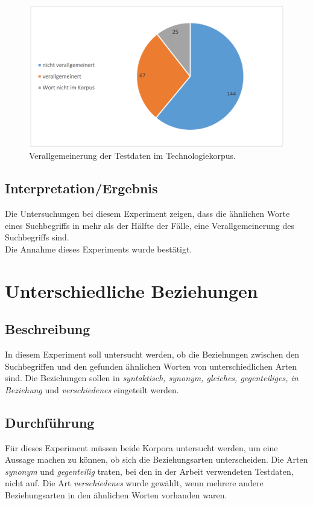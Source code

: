 \documentclass[12pt,a4paper]{report}
\begin{document}
\begin{figure}[p]
  \begin{center}
	\includegraphics[scale=0.4]{VerallgemeinerungTech.PNG}
  \end{center}  
  \caption{Verallgemeinerung der Testdaten im Technologiekorpus.}
  \end{figure}	
  \newpage
		\subsection{Interpretation/Ergebnis}
		Die Untersuchungen bei diesem Experiment zeigen, dass die ähnlichen Worte eines Suchbegriffs in mehr als der Hälfte der Fälle, eine Verallgemeinerung des Suchbegriffs sind. \\
		Die Annahme dieses Experiments wurde bestätigt.\\
		
		
	\newpage
	\section{Unterschiedliche Beziehungen}
		\subsection{Beschreibung}
		In diesem Experiment soll untersucht werden, ob die Beziehungen zwischen den Suchbegriffen und den gefunden ähnlichen Worten von unterschiedlichen Arten sind. Die Beziehungen sollen in \textit{syntaktisch, synonym, gleiches, gegenteiliges, in Beziehung} und \textit{verschiedenes} eingeteilt werden.
		\subsection{Durchführung}
		Für dieses Experiment müssen beide Korpora untersucht werden, um eine Aussage machen zu können, ob sich die Beziehungsarten unterscheiden. Die Arten \textit{synonym} und \textit{gegenteilig} traten, bei den in der Arbeit verwendeten Testdaten, nicht auf. Die Art \textit{verschiedenes} wurde gewählt, wenn mehrere andere Beziehungsarten in den ähnlichen Worten vorhanden waren.
		
\end{document}
